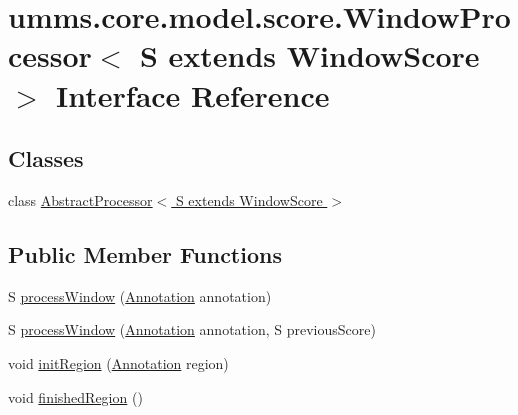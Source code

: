 \hypertarget{interfaceumms_1_1core_1_1model_1_1score_1_1_window_processor_3_01_s_01extends_01_window_score_01_4}{\section{umms.\+core.\+model.\+score.\+Window\+Processor$<$ S extends Window\+Score $>$ Interface Reference}
\label{interfaceumms_1_1core_1_1model_1_1score_1_1_window_processor_3_01_s_01extends_01_window_score_01_4}
}
\subsection*{Classes}
\begin{DoxyCompactItemize}
\item 
class \hyperlink{classumms_1_1core_1_1model_1_1score_1_1_window_processor_3_01_s_01extends_01_window_score_01_4_1ca0a3751200684ea73fe33d33dcb315e}{Abstract\+Processor$<$ S extends Window\+Score $>$}
\end{DoxyCompactItemize}
\subsection*{Public Member Functions}
\begin{DoxyCompactItemize}
\item 
S \hyperlink{interfaceumms_1_1core_1_1model_1_1score_1_1_window_processor_3_01_s_01extends_01_window_score_01_4_aa5195144cef9a77228dad9dff3027de1}{process\+Window} (\hyperlink{interfaceumms_1_1core_1_1annotation_1_1_annotation}{Annotation} annotation)
\item 
S \hyperlink{interfaceumms_1_1core_1_1model_1_1score_1_1_window_processor_3_01_s_01extends_01_window_score_01_4_a31bb5ae32c281188f171191595721694}{process\+Window} (\hyperlink{interfaceumms_1_1core_1_1annotation_1_1_annotation}{Annotation} annotation, S previous\+Score)
\item 
void \hyperlink{interfaceumms_1_1core_1_1model_1_1score_1_1_window_processor_3_01_s_01extends_01_window_score_01_4_a4a24747b66f15f4da6ed7d08c9061407}{init\+Region} (\hyperlink{interfaceumms_1_1core_1_1annotation_1_1_annotation}{Annotation} region)
\item 
void \hyperlink{interfaceumms_1_1core_1_1model_1_1score_1_1_window_processor_3_01_s_01extends_01_window_score_01_4_ac2082a626e74991a6145592ffc257c8c}{finished\+Region} ()
\end{DoxyCompactItemize}


